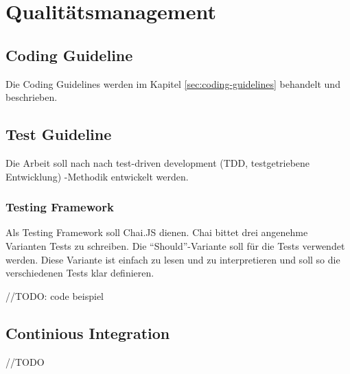 \section{Qualitätsmanagement}

\subsection{Coding Guideline}
Die Coding Guidelines werden im Kapitel \ref{sec:coding-guidelines}  behandelt und beschrieben.

\subsection{Test Guideline}
Die Arbeit soll nach nach test-driven development (TDD, testgetriebene Entwicklung) -Methodik entwickelt werden.

\subsubsection*{Testing Framework}
Als Testing Framework soll Chai.JS \cite{ChaiJS} dienen. Chai bittet drei angenehme Varianten Tests zu schreiben. Die ``Should''-Variante soll für die Tests verwendet werden. Diese Variante ist einfach zu lesen und zu interpretieren und soll so die verschiedenen Tests klar definieren.

//TODO: code beispiel

\subsection{Continious Integration}
//TODO